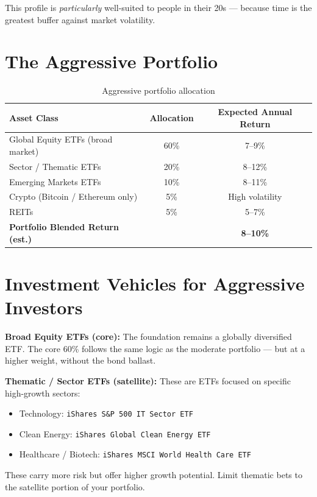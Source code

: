 \documentclass[12pt, a4paper]{book}
\begin{document}
This profile is \textit{particularly} well-suited to people in their 20s --- because time is the greatest buffer against market volatility.

\section{The Aggressive Portfolio}

\begin{table}[h!]
\centering
\begin{tabular}{lcc}
\toprule
\textbf{Asset Class} & \textbf{Allocation} & \textbf{Expected Annual Return} \\
\midrule
Global Equity ETFs (broad market) & 60\% & 7--9\% \\
Sector / Thematic ETFs & 20\% & 8--12\% \\
Emerging Markets ETFs & 10\% & 8--11\% \\
Crypto (Bitcoin / Ethereum only) & 5\% & High volatility \\
REITs & 5\% & 5--7\% \\
\midrule
\textbf{Portfolio Blended Return (est.)} & & \textbf{8--10\%} \\
\bottomrule
\end{tabular}
\caption{Aggressive portfolio allocation}
\end{table}

\section{Investment Vehicles for Aggressive Investors}

\textbf{Broad Equity ETFs (core):} The foundation remains a globally diversified ETF. The core 60\% follows the same logic as the moderate portfolio --- but at a higher weight, without the bond ballast.

\textbf{Thematic / Sector ETFs (satellite):} These are ETFs focused on specific high-growth sectors:
\begin{itemize}[leftmargin=1.5cm]
  \item Technology: \texttt{iShares S\&P 500 IT Sector ETF}
  \item Clean Energy: \texttt{iShares Global Clean Energy ETF}
  \item Healthcare / Biotech: \texttt{iShares MSCI World Health Care ETF}
\end{itemize}
These carry more risk but offer higher growth potential. Limit thematic bets to the satellite portion of your portfolio.
\end{document}
